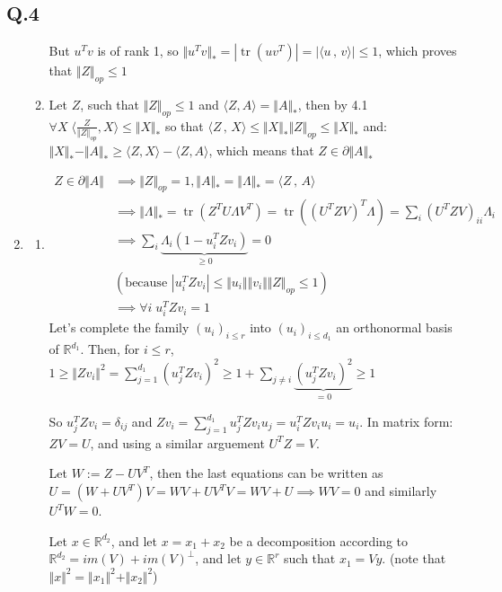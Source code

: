 \documentclass[12pt]{article}
\newcommand{\Q}[1]{\subsection*{Q.#1}}
\newenvironment{question}[1]
{\Q{#1}}{}
\newcommand{\norm}[1]{\Vert #1 \Vert}
\newcommand{\nucnorm}[1]{\Vert #1 \Vert_*}
\newcommand{\opnorm}[1]{\Vert #1 \Vert_{op}}
\newcommand{\inner}[2]{\langle #1 \, , \, #2 \rangle}
\DeclareMathOperator{\tr}{tr}
\begin{document}
\begin{question}{4}
\begin{enumerate}
\begin{enumerate}
      But $u^Tv$ is of rank 1, so $\nucnorm{u^Tv} = |\tr(uv^T)| = |\inner{u}{v}| \le 1$,  which proves that $\opnorm{Z} \le 1$
      
    \item[$\Leftarrow$]Let $Z$, such that $\norm{Z}_{op} \le 1$ and $\langle Z, A\rangle  = \norm{A}_*$, then by 4.1 $\forall X \;  \langle \frac{Z}{\opnorm{Z}}, X\rangle  \le \norm{X}_* $ so that $\inner{Z}{X}\le \norm{X}_*\opnorm{Z} \le \nucnorm{X}$ and:
      $\norm{X}_* - \norm{A}_* \ge \langle Z, X\rangle  - \langle Z, A\rangle $, which means that $Z \in \partial \norm{A}_*$
      
    \end{enumerate}
  \item[4.4]
    \begin{enumerate}
    \item 
      \begin{align*}
        Z \in \partial \norm{A} &\implies \norm{Z}_{op} = 1, \norm{A}_* = \norm{\Lambda}_* = \inner{Z}{A}\\
                                &\implies \norm{\Lambda}_* = \tr(Z^T U\Lambda V^T) = \tr( (U^TZV)^T \Lambda ) = \sum_i (U^TZV)_{ii} \Lambda_i\\
                                & \implies \sum_i \underbrace{\Lambda_i ( 1- u_i^TZv_i)}_{\ge 0} = 0\\
                                & ( \text{because }|u_i^TZv_i| \le \norm{u_i}\norm{v_i}\opnorm{Z} \le 1)\\
                                & \implies \forall i \; u_i^TZv_i = 1
      \end{align*}
      Let's complete the family $(u_i)_{i \le r}$ into $(u_i)_{i \le d_1}$ an orthonormal basis of $\mathbb R^{d_1}$.
      Then, for $i \le r$, $1 \ge \norm{Zv_i}^2 = \sum_{j=1}^{d_1} (u_j^T Zv_i)^2 \ge 1 + \sum_{j \ne i} \underbrace{(u_j^T Zv_i)^2}_{= 0} \ge 1$

      So $u_j^TZv_i = \delta_{ij} $ and $Zv_i = \sum_{j=1}^{d_1} u_j^TZv_i u_j = u_i^TZv_i u_i = u_i$. In matrix form: $ZV = U$, and using a similar arguement $U^TZ = V$.
      
      Let $W := Z - UV^T$, then the last equations can be written as $U = (W + UV^T)V = WV + UV^TV = WV + U \implies WV = 0$ and similarly $U^TW = 0$.

      Let $x \in \mathbb R^{d_2}$, and let $x = x_1 + x_2$ be a decomposition according to  $\mathbb R^{d_2} = im(V) + im(V)^{\perp}$, and let $y \in \mathbb R^r$ such that $x_1 = Vy$. (note that $\norm{x}^2 = \norm{x_1}^2 + \norm{x_2}^2$)


\end{enumerate}
\end{enumerate}
\end{question}
\end{document}

